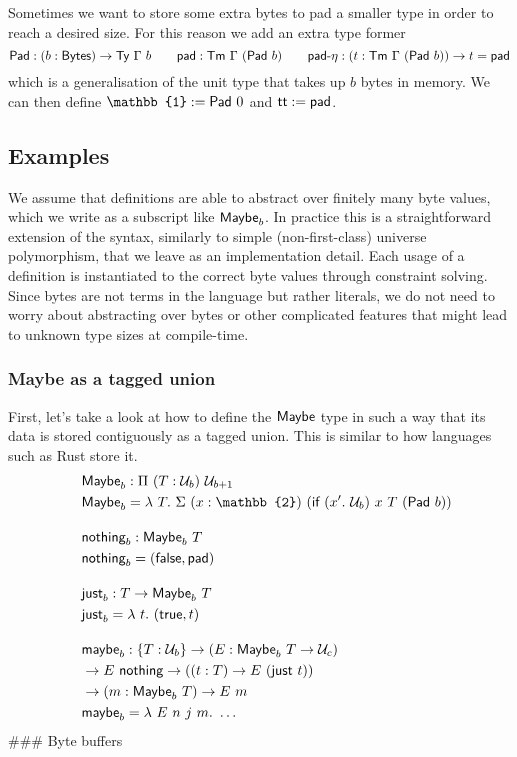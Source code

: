 Sometimes we want to store some extra bytes to pad a smaller type in
order to reach a desired size. For this reason we add an extra type
former \[
\syn{Pad} : (b : \Bytes) \to \Ty\ \Gamma\ b \qquad \syn{pad} : \Tm\ \Gamma\ (\syn{Pad}\ b) \qquad
\syn{pad-$\eta$} : (t : \Tm\ \Gamma\ (\syn{Pad}\ b)) \to t = \syn{pad}
\] which is a generalisation of the unit type that takes up \(b\) bytes
in memory. We can then define \(\mathbb{1} := \syn{Pad}\ 0\) and
\(\textsf{tt} := \textsf{pad}\).

\subsection{Examples}\label{examples}

We assume that definitions are able to abstract over finitely many byte
values, which we write as a subscript like \(\textsf{Maybe}_b\). In
practice this is a straightforward extension of the syntax, similarly to
simple (non-first-class) universe polymorphism, that we leave as an
implementation detail. Each usage of a definition is instantiated to the
correct byte values through constraint solving. Since bytes are not
terms in the language but rather literals, we do not need to worry about
abstracting over bytes or other complicated features that might lead to
unknown type sizes at compile-time.

\subsubsection{Maybe as a tagged union}\label{maybe-as-a-tagged-union}

First, let's take a look at how to define the \(\textsf{Maybe}\) type in
such a way that its data is stored contiguously as a tagged union. This
is similar to how languages such as Rust store it. \[
\begin{aligned}
&\syn{Maybe}_b : \Pi\ (T : \univ_b)\ \univ_{b + 1} \\
&\syn{Maybe}_b = \lambda\ T.\
\Sigma\ (x : \mathbb{2})\ (\syn{if}\ (x'.\ \univ_b)\ x\ T\ (\syn{Pad}\ b)) \\[1em]
&\syn{nothing}_b : \syn{Maybe}_b\ T \\
&\syn{nothing}_b = (\syn{false}, \syn{pad}) \\[1em]
&\syn{just}_b : T \to \syn{Maybe}_b\ T \\
&\syn{just}_b = \lambda\ t.\  (\syn{true}, t) \\[1em]
&\syn{maybe}_b : \{T : \univ_b\} \to (E : \syn{Maybe}_b\ T \to  \univ_c) \\
\quad & \to E\ \syn{nothing} \to ((t : T) \to E\ (\syn{just}\ t)) \\
\quad & \to (m : \syn{Maybe}_b\ T) \to E\ m \\
&\syn{maybe}_b = \lambda\ E\ n\ j\ m.\ \ldots
\end{aligned}
\] \#\#\# Byte buffers

